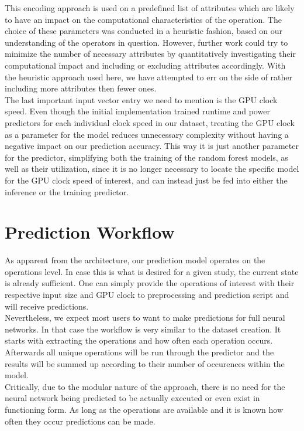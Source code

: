 This encoding approach is used on a predefined list of attributes which are likely to have an impact on the computational characteristics of the operation. The choice of these parameters was conducted in a heuristic fashion, based on our understanding of the operators in question. However, further work could try to minimize the number of necessary attributes by quantitatively investigating their computational impact and including or excluding attributes accordingly. With the heuristic approach used here, we have attempted to err on the side of rather including more attributes then fewer ones. \\
The last important input vector entry we need to mention is the GPU clock speed. Even though the initial implementation trained runtime and power predictors for each individual clock speed in our dataset, treating the GPU clock as a parameter for the model reduces unnecessary complexity without having a negative impact on our prediction accuracy. This way it is just another parameter for the predictor, simplifying both the training of the random forest models, as well as their utilization, since it is no longer necessary to locate the specific model for the GPU clock speed of interest, and can instead just be fed into either the inference or the training predictor.



\section{Prediction Workflow}
As apparent from the architecture, our prediction model operates on the operations level. In case this is what is desired for a given study, the current state is already sufficient. One can simply provide the operations of interest with their respective input size and GPU clock to preprocessing and prediction script and will receive predictions. \\
Nevertheless, we expect most users to want to make predictions for full neural networks. In that case the workflow is very similar to the dataset creation. It starts with extracting the operations and how often each operation occurs. Afterwards all unique operations will be run through the predictor and the results will be summed up according to their number of occurences within the model.\\
Critically, due to the modular nature of the approach, there is no need for the neural network being predicted to be actually executed or even exist in functioning form. As long as the operations are available and it is known how often they occur predictions can be made.